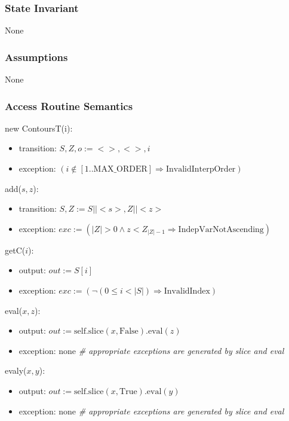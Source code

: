\documentclass[12pt, titlepage]{article}
\begin{document}
\subsubsection {State Invariant}

None

\subsubsection {Assumptions}

None

\subsubsection {Access Routine Semantics}

new ContoursT(i):
\begin{itemize}
\item transition: $S, Z, o := < >, <>, i$
\item exception: $(i \notin [1..\mbox{MAX\_ORDER}] \Rightarrow \mbox{InvalidInterpOrder})$

\end{itemize}

\noindent add($s, z$):
\begin{itemize}
\item transition: $S, Z := S || <s>, Z || <z>$
\item exception: $exc := (|Z| > 0 \wedge z
  < Z_{|Z|-1} \Rightarrow \mbox{IndepVarNotAscending})$
\end{itemize}

\noindent getC($i$):
\begin{itemize}
\item output: $out := S[i]$
\item exception: $exc := (\neg(0 \leq i < |S|) \Rightarrow \mbox{InvalidIndex})$
\end{itemize}

\noindent eval($x, z$):
\begin{itemize}
\item output: $out := \mbox{self.slice}(x, \text{False}).\mbox{eval}(z)$
\item exception: none \textit{\# appropriate exceptions are generated by slice
    and eval}
\end{itemize}

\noindent evaly($x, y$):
\begin{itemize}
\item output: $out := \mbox{self.slice}(x, \text{True}).\mbox{eval}(y)$
\item exception: none \textit{\# appropriate exceptions are generated by slice
    and eval}
\end{itemize}
\end{document}
